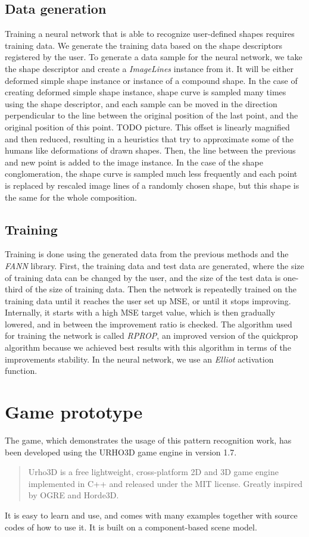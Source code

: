 \subsection{Data generation}
Training a neural network that is able to recognize user-defined shapes requires training data. We generate the training data based on the shape descriptors registered by the user. To generate a data sample for the neural network, we take the shape descriptor and create a \emph{ImageLines} instance from it. It will be either deformed simple shape instance or instance of a compound shape. In the case of creating deformed simple shape instance, shape curve is sampled many times using the shape descriptor, and each sample can be moved in the direction perpendicular to the line between the original position of the last point, and the original position of this point. TODO picture. This offset is linearly magnified and then reduced, resulting in a heuristics that try to approximate some of the humans like deformations of drawn shapes. Then, the line between the previous and new point is added to the image instance. In the case of the shape conglomeration, the shape curve is sampled much less frequently and each point is replaced by rescaled image lines of a randomly chosen shape, but this shape is the same for the whole composition.

\subsection{Training}
Training is done using the generated data from the previous methods and the \emph{FANN} library. First, the training data and test data are generated, where the size of training data can be changed by the user, and the size of the test data is one-third of the size of training data. Then the network is repeatedly trained on the training data until it reaches the user set up MSE, or until it stops improving. Internally, it starts with a high MSE target value, which is then gradually lowered, and in between the improvement ratio is checked. The algorithm used for training the network is called \emph{RPROP}, an improved version of the quickprop algorithm because we achieved best results with this algorithm in terms of the improvements stability. In the neural network, we use an \emph{Elliot} activation function.

\section{Game prototype}
The game, which demonstrates the usage of this pattern recognition work, has been developed using the URHO3D game engine in version 1.7. \begin{quotation} Urho3D is a free lightweight, cross-platform 2D and 3D game engine implemented in C++ and released under the MIT license. Greatly inspired by OGRE and Horde3D. \end{quotation} It is easy to learn and use, and comes with many examples together with source codes of how to use it. It is built on a component-based scene model. 

